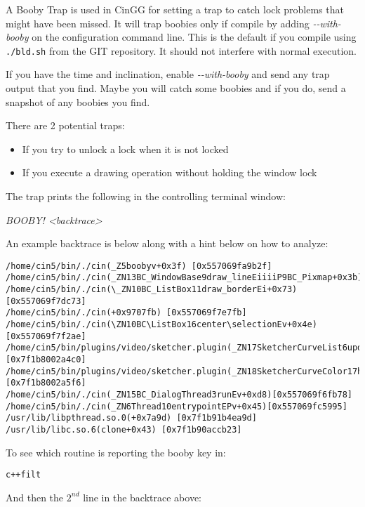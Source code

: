 A Booby Trap is used in CinGG for setting a trap to catch lock problems that might have been missed. It will trap boobies only if compile by adding \textit{-{}-with-booby} on the configuration command line. This is the default if you compile using \texttt{./bld.sh} from the GIT repository. It should not interfere with normal execution.

If you have the time and inclination, enable \textit{-{}-with-booby} and send any trap output that you find. Maybe you will catch some boobies and if you do, send a snapshot of any boobies you find.

There are 2 potential traps:

\begin{itemize}[nosep]
	\item If you try to unlock a lock when it is not locked
	\item If you execute a drawing operation without holding the window lock
\end{itemize}

The trap prints the following in the controlling terminal window:

\hspace{2em} \textit{BOOBY! \qquad <backtrace>}

An example backtrace is below along with a hint below on how to analyze:

\begin{lstlisting}[numbers=none]
/home/cin5/bin/./cin(_Z5boobyv+0x3f) [0x557069fa9b2f] /home/cin5/bin/./cin(_ZN13BC_WindowBase9draw_lineEiiiiP9BC_Pixmap+0x3b)0x557069fb9a9b]
/home/cin5/bin/./cin(\_ZN10BC_ListBox11draw_borderEi+0x73)[0x557069f7dc73]
/home/cin5/bin/./cin(+0x9707fb) [0x557069f7e7fb]
/home/cin5/bin/./cin(\ZN10BC\ListBox16center\selectionEv+0x4e)[0x557069f7f2ae]
/home/cin5/bin/plugins/video/sketcher.plugin(_ZN17SketcherCurveList6updateEi+0x1a0)[0x7f1b8002a4c0]
/home/cin5/bin/plugins/video/sketcher.plugin(_ZN18SketcherCurveColor17handle_done_eventEi+0x76)[0x7f1b8002a5f6]
/home/cin5/bin/./cin(_ZN15BC_DialogThread3runEv+0xd8)[0x557069f6fb78]
/home/cin5/bin/./cin(_ZN6Thread10entrypointEPv+0x45)[0x557069fc5995]
/usr/lib/libpthread.so.0(+0x7a9d) [0x7f1b91b4ea9d]
/usr/lib/libc.so.6(clone+0x43) [0x7f1b90accb23]
\end{lstlisting}

To see which routine is reporting the booby key in:

\hspace{2em} \texttt{c++filt}

And then the $2^{nd}$ line in the backtrace above:

